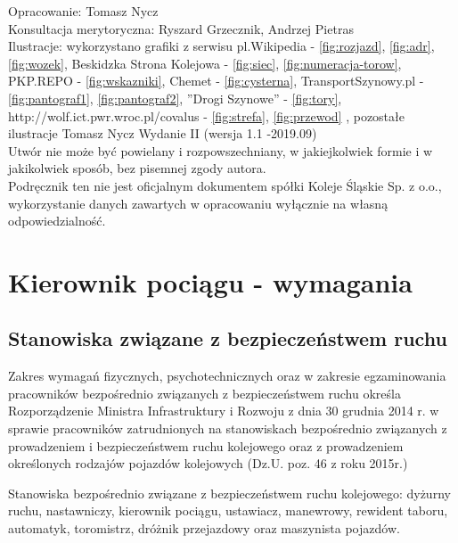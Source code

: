 \documentclass[usenames,dvipsnames,svgnames,table,a4paper,openany,justified]{tufte-book}
\begin{document}
Opracowanie: Tomasz Nycz\\
Konsultacja merytoryczna: Ryszard Grzecznik, Andrzej Pietras\\
Ilustracje: wykorzystano grafiki z serwisu pl.Wikipedia - \ref{fig:rozjazd}, \ref{fig:adr}, \ref{fig:wozek}, Beskidzka Strona Kolejowa  - \ref{fig:siec}, \ref{fig:numeracja-torow}, PKP.REPO - \ref{fig:wskazniki}, Chemet - \ref{fig:cysterna}, TransportSzynowy.pl - \ref{fig:pantograf1}, \ref{fig:pantograf2}, ''Drogi Szynowe'' - \ref{fig:tory}, http://wolf.ict.pwr.wroc.pl/covalus - \ref{fig:strefa}, \ref{fig:przewod} , pozostałe ilustracje Tomasz Nycz
\vfill
Wydanie II (wersja 1.1 -2019.09)\\
Utwór nie może być powielany i rozpowszechniany, w jakiejkolwiek formie
i w jakikolwiek sposób, bez pisemnej zgody autora.  
\\Podręcznik ten nie jest oficjalnym dokumentem spółki Koleje Śląskie Sp. z o.o., wykorzystanie danych zawartych w opracowaniu wyłącznie na własną odpowiedzialność. 

\part{Kierownik pociągu - wymagania}
\chapter{Stanowiska związane z bezpieczeństwem ruchu}
Zakres wymagań fizycznych, psychotechnicznych oraz w zakresie egzaminowania pracowników bezpośrednio związanych z bezpieczeństwem ruchu określa Rozporządzenie Ministra Infrastruktury i Rozwoju z dnia 30 grudnia 2014 r. w sprawie pracowników zatrudnionych na stanowiskach bezpośrednio związanych z prowadzeniem i bezpieczeństwem ruchu kolejowego oraz z prowadzeniem określonych rodzajów pojazdów kolejowych (Dz.U. poz. 46 z roku 2015r.)

Stanowiska bezpośrednio związane z bezpieczeństwem ruchu kolejowego: dyżurny ruchu, nastawniczy, kierownik pociągu, ustawiacz, manewrowy, rewident taboru, automatyk, toromistrz, dróżnik przejazdowy oraz maszynista pojazdów.
\end{document}
